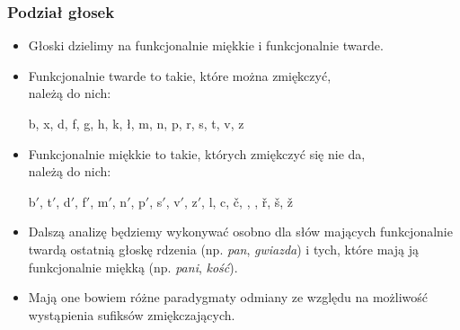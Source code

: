 \documentclass{beamer}
\begin{document}
\begin{frame}
\frametitle{Podział głosek}
\begin{itemize}
\item Głoski dzielimy na funkcjonalnie miękkie i funkcjonalnie twarde.
\item Funkcjonalnie twarde to takie, które można zmiękczyć,\\ należą do nich:
\begin{center}
b, x, d, f, g, h, k, ł, m, n, p, r, s, t, v, z
\end{center}
\item Funkcjonalnie miękkie to takie, których zmiękczyć się nie da,\\ należą do nich:
\begin{center}
b$'$, t$'$, d$'$, f$'$, m$'$, n$'$, p$'$, s$'$, v$'$, z$'$, l, c, č, , , ř, š, ž
\end{center}
\item Dalszą analizę będziemy wykonywać osobno dla słów mających funkcjonalnie twardą ostatnią głoskę rdzenia (np. {\it pan}, {\it gwiazda})
i tych, które mają ją funkcjonalnie miękką (np. {\it pani}, {\it kość}).
\item Mają one bowiem różne paradygmaty odmiany ze względu na możliwość wystąpienia sufiksów zmiękczających.
\end{itemize}
\end{frame}
\end{document}
